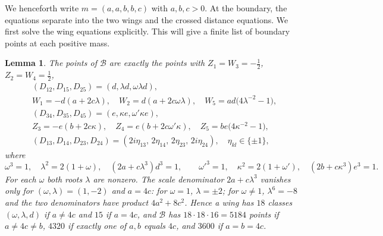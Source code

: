 \documentclass[11pt]{amsart}
\newtheorem{lemma}[theorem]{Lemma}
\theoremstyle{definition}
\theoremstyle{remark}
\begin{document}
{
We henceforth write $m=(a,a,b,b,c)$ with $a,b,c>0$.
At the boundary, the equations separate into the two wings and the crossed
distance equations.  We first solve the wing equations explicitly.  This
will give a finite list of boundary points at each positive mass.
}

{\begin{lemma}\label{d6-lem-atlas}
The points of $\mathcal B$ are exactly the points with $Z_1=W_3=-\frac12$, $Z_2=W_4=\frac12$,
\begin{gather*}
  (D_{12},D_{15},D_{25})=(d,\lambda d,\omega\lambda d),\\
  W_1=-d(a+2c\lambda),\quad
  W_2=d(a+2c\omega\lambda),\quad W_5=ad\bigl(4\lambda^{-2}-1\bigr),\\
  (D_{34},D_{35},D_{45})=(e,\kappa e,\omega'\kappa e),\\
  Z_3=-e(b+2c\kappa),\quad
  Z_4=e(b+2c\omega'\kappa),\quad Z_5=be\bigl(4\kappa^{-2}-1\bigr),\\
  (D_{13},D_{14},D_{23},D_{24})=(2i\eta_{13},\,2\eta_{14},\,2\eta_{23},\,2i\eta_{24}),\quad
  \eta_{kl}\in\{\pm1\},
\end{gather*}
where
\begin{equation}\label{d6-eq-wing}
  \omega^3=1,\quad\lambda^2=2(1+\omega),\quad(2a+c\lambda^3)d^3=1,\qquad
  \omega'^3=1,\quad\kappa^2=2(1+\omega'),\quad(2b+c\kappa^3)e^3=1.
\end{equation}
For each $\omega$ both roots $\lambda$ are nonzero.  The scale denominator $2a+c\lambda^3$
vanishes only for $(\omega,\lambda)=(1,-2)$ and $a=4c$: for $\omega=1$, $\lambda=\pm2$; for
$\omega\ne1$, $\lambda^6=-8$ and the two denominators have product $4a^2+8c^2$.  Hence a wing
has $18$ classes $(\omega,\lambda,d)$ if $a\ne4c$ and $15$ if $a=4c$, and $\mathcal B$ has
$18\cdot18\cdot16=5184$ points if $a\ne4c\ne b$, $4320$ if exactly one of $a,b$ equals $4c$, and
$3600$ if $a=b=4c$.
\end{lemma}}
\end{document}
